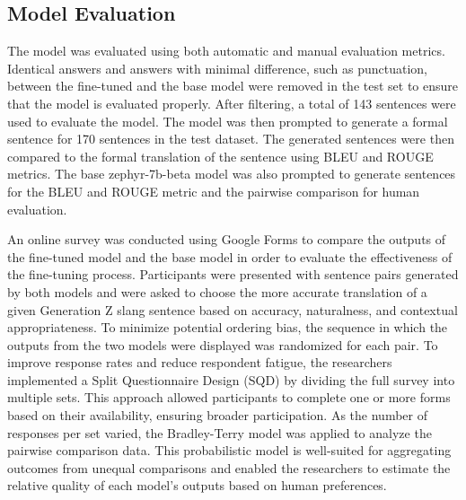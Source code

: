 \subsection{Model Evaluation}
The model was evaluated using both automatic and manual evaluation metrics. Identical answers and answers with minimal difference, such as punctuation, between the fine-tuned and the base model were removed in the test set to ensure that the model is evaluated properly. After filtering, a total of 143 sentences were used to evaluate the model. The model was then prompted to generate a formal sentence for 170 sentences in the test dataset. The generated sentences were then compared to the formal translation of the sentence using BLEU and ROUGE metrics. The base zephyr-7b-beta model was also prompted to generate sentences for the BLEU and ROUGE metric and the pairwise comparison for human evaluation. 

An online survey was conducted using Google Forms to compare the outputs of the fine-tuned model and the base model in order to evaluate the effectiveness of the fine-tuning process. Participants were presented with sentence pairs generated by both models and were asked to choose the more accurate translation of a given Generation Z slang sentence based on accuracy, naturalness, and contextual appropriateness. To minimize potential ordering bias, the sequence in which the outputs from the two models were displayed was randomized for each pair. To improve response rates and reduce respondent fatigue, the researchers implemented a Split Questionnaire Design (SQD) by dividing the full survey into multiple sets. This approach allowed participants to complete one or more forms based on their availability, ensuring broader participation. As the number of responses per set varied, the Bradley-Terry model was applied to analyze the pairwise comparison data. This probabilistic model is well-suited for aggregating outcomes from unequal comparisons and enabled the researchers to estimate the relative quality of each model’s outputs based on human preferences.
